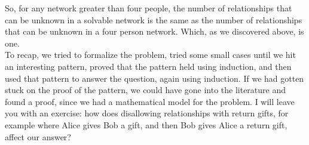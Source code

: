 \documentclass{article}
\begin{document}
So, for any network greater than four people, the number of relationships that can be unknown in a solvable network is the same as the number of relationships that can be unknown in a four person network. Which, as we discovered above, is one.\\

To recap, we tried to formalize the problem, tried some small cases until we hit an interesting pattern, proved that the pattern held using induction, and then used that pattern to answer the question, again using induction. If we had gotten stuck on the proof of the pattern, we could have gone into the literature and found a proof, since we had a mathematical model for the problem. I will leave you with an exercise: how does disallowing relationships with return gifts, for example where Alice gives Bob a gift, and then Bob gives Alice a return gift, affect our answer?\\
\end{document}
